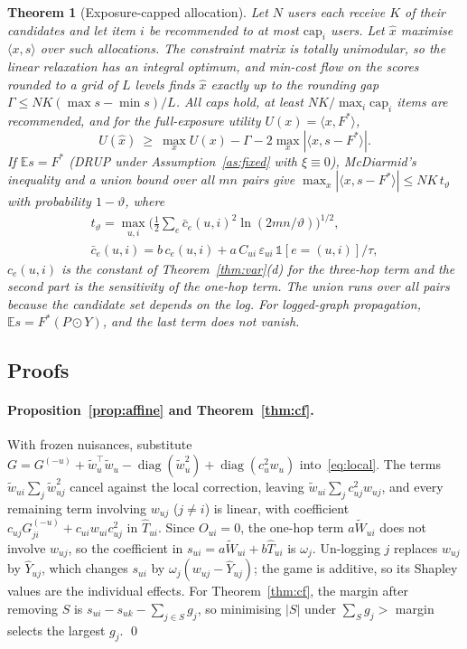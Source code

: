 \documentclass[preprint,review,12pt,authoryear]{elsarticle}
\newtheorem{theorem}{Theorem}
\theoremstyle{definition}
\newcommand{\E}{\mathbb{E}}
\newcommand{\diag}{\operatorname{diag}}
\newcommand{\tW}{\tilde W}
\begin{document}
\begin{theorem}[Exposure-capped allocation]\label{thm:alloc}
Let $N$ users each receive $K$ of their candidates and let item $i$ be
recommended to at most $\mathrm{cap}_i$ users. Let $\hat x$ maximise $\langle x,s\rangle$
over such allocations. The constraint matrix is totally unimodular, so the
linear relaxation has an integral optimum, and min-cost flow on the scores
rounded to a grid of $L$ levels finds $\hat x$ exactly up to the rounding gap
$\Gamma\le NK(\max s-\min s)/L$. All caps hold, at least $NK/\max_i\mathrm{cap}_i$
items are recommended, and for the full-exposure utility $U(x)=\langle x,F^*\rangle$,
\[
U(\hat x)\ \ge\ \max_{x}U(x)-\Gamma-2\max_x|\langle x,s-F^*\rangle| .
\]
If $\E s=F^*$ (DRUP under Assumption~\ref{as:fixed} with $\xi\equiv0$),
McDiarmid's inequality and a union bound over all $mn$ pairs give
$\max_x|\langle x,s-F^*\rangle|\le NK\,t_\vartheta$ with probability $1-\vartheta$, where
\begin{gather*}
t_\vartheta=\max_{u,i}\Big(\tfrac12\textstyle\sum_e\bar c_e(u,i)^2\ln(2mn/\vartheta)\Big)^{1/2},\\
\bar c_e(u,i)=b\,c_e(u,i)+a\,C_{ui}\,\varepsilon_{ui}\,\mathbb 1[e=(u,i)]/\tau ,
\end{gather*}
$c_e(u,i)$ is the constant of Theorem~\ref{thm:var}(d) for the three-hop term
and the second part is the sensitivity of the one-hop term. The union runs over
all pairs because the candidate set depends on the log. For logged-graph propagation,
$\E s=F^*(P\odot Y)$, and the last term does not vanish.
\end{theorem}

\subsection{Proofs}\label{sec:structproofs}

\paragraph{Proposition~\ref{prop:affine} and Theorem~\ref{thm:cf}.}
With frozen nuisances, substitute
$G=G^{(-u)}+\tilde w_u^\top\tilde w_u-\diag(\tilde w_u^2)+\diag(c_u^2w_u)$
into~\eqref{eq:local}. The terms $\tilde w_{ui}\sum_j\tilde w_{uj}^2$ cancel against the
local correction, leaving $\tilde w_{ui}\sum_jc_{uj}^2w_{uj}$, and every remaining term
involving $w_{uj}$ ($j\neq i$) is linear, with coefficient
$c_{uj}G^{(-u)}_{ji}+c_{ui}w_{ui}c_{uj}^2$ in $\hat T_{ui}$. Since $O_{ui}=0$, the one-hop
term $a\tW_{ui}$ does not involve $w_{uj}$, so the coefficient in $s_{ui}=a\tW_{ui}+b\hat T_{ui}$
is $\omega_j$. Un-logging $j$ replaces $w_{uj}$ by
$\hat Y_{uj}$, which changes $s_{ui}$ by $\omega_j(w_{uj}-\hat Y_{uj})$; the game is additive, so
its Shapley values are the individual effects. For Theorem~\ref{thm:cf}, the
margin after removing $S$ is $s_{ui}-s_{uk}-\sum_{j\in S}g_j$, so minimising $|S|$
under $\sum_Sg_j>$ margin selects the largest $g_j$. \qed
\end{document}
